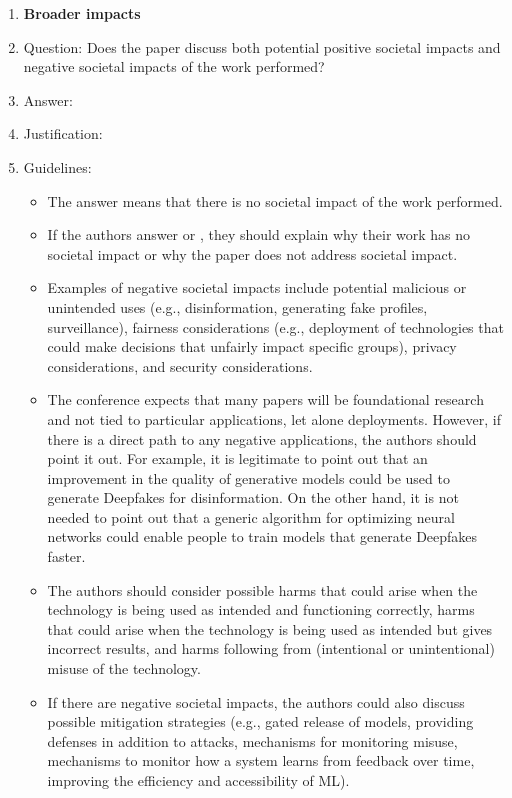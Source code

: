\documentclass{article}
\begin{document}
\begin{enumerate}
\item {\bf Broader impacts}
    \item[] Question: Does the paper discuss both potential positive societal impacts and negative societal impacts of the work performed?
    \item[] Answer: \answerTODO{} %
    \item[] Justification: \justificationTODO{}
    \item[] Guidelines:
    \begin{itemize}
        \item The answer \answerNA{} means that there is no societal impact of the work performed.
        \item If the authors answer \answerNA{} or \answerNo, they should explain why their work has no societal impact or why the paper does not address societal impact.
        \item Examples of negative societal impacts include potential malicious or unintended uses (e.g., disinformation, generating fake profiles, surveillance), fairness considerations (e.g., deployment of technologies that could make decisions that unfairly impact specific groups), privacy considerations, and security considerations.
        \item The conference expects that many papers will be foundational research and not tied to particular applications, let alone deployments. However, if there is a direct path to any negative applications, the authors should point it out. For example, it is legitimate to point out that an improvement in the quality of generative models could be used to generate Deepfakes for disinformation. On the other hand, it is not needed to point out that a generic algorithm for optimizing neural networks could enable people to train models that generate Deepfakes faster.
        \item The authors should consider possible harms that could arise when the technology is being used as intended and functioning correctly, harms that could arise when the technology is being used as intended but gives incorrect results, and harms following from (intentional or unintentional) misuse of the technology.
        \item If there are negative societal impacts, the authors could also discuss possible mitigation strategies (e.g., gated release of models, providing defenses in addition to attacks, mechanisms for monitoring misuse, mechanisms to monitor how a system learns from feedback over time, improving the efficiency and accessibility of ML).
    \end{itemize}
    

\end{enumerate}
\end{document}
